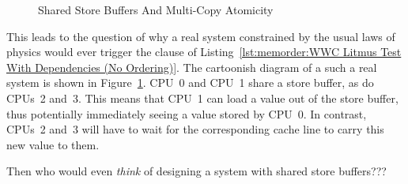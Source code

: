 \begin{figure}[tb]
\centering
{}
\caption{Shared Store Buffers And Multi-Copy Atomicity}
\label{fig:memorder:Shared Store Buffers And Multi-Copy Atomicity}
\end{figure}

This leads to the question of why a real system constrained by the
usual laws of physics would ever trigger the  clause of
Listing~\ref{lst:memorder:WWC Litmus Test With Dependencies (No Ordering)}.
The cartoonish diagram of a such a real system is shown in
Figure~\ref{fig:memorder:Shared Store Buffers And Multi-Copy Atomicity}.
CPU~0 and CPU~1 share a store buffer, as do CPUs~2 and~3.
This means that CPU~1 can load a value out of the store buffer, thus
potentially immediately seeing a value stored by CPU~0.
In contrast, CPUs~2 and~3 will have to wait for the corresponding cache
line to carry this new value to them.

\QuickQuiz{}
	Then who would even \emph{think} of designing a system with shared
	store buffers???
 \QuickQuizEnd

